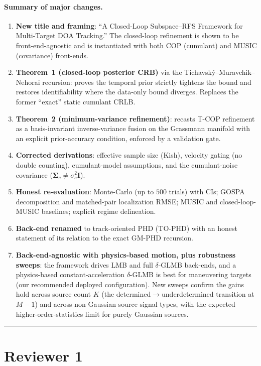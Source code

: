\documentclass[11pt]{article}
\begin{document}
\paragraph{Summary of major changes.}
\begin{enumerate}[leftmargin=*]
\item \textbf{New title and framing}: ``A Closed-Loop Subspace--RFS Framework
  for Multi-Target DOA Tracking.'' The closed-loop refinement is shown to be
  front-end-agnostic and is instantiated with both COP (cumulant) and MUSIC
  (covariance) front-ends.
\item \textbf{Theorem~1 (closed-loop posterior CRB)} via the
  Tichavsk\'y--Muravchik--Nehorai recursion: proves the temporal prior strictly
  tightens the bound and restores identifiability where the data-only bound
  diverges. Replaces the former ``exact'' static cumulant CRLB.
\item \textbf{Theorem~2 (minimum-variance refinement)}: recasts T-COP refinement
  as a basis-invariant inverse-variance fusion on the Grassmann manifold with an
  explicit prior-accuracy condition, enforced by a validation gate.
\item \textbf{Corrected derivations}: effective sample size (Kish), velocity
  gating (no double counting), cumulant-model assumptions, and the cumulant-noise
  covariance ($\mathbf\Sigma_c\neq\sigma_c^2\mathbf I$).
\item \textbf{Honest re-evaluation}: Monte-Carlo (up to $500$ trials) with CIs; GOSPA
  decomposition and matched-pair localization RMSE; MUSIC and closed-loop-MUSIC
  baselines; explicit regime delineation.
\item \textbf{Back-end renamed} to track-oriented PHD (TO-PHD) with an honest
  statement of its relation to the exact GM-PHD recursion.
\item \textbf{Back-end-agnostic with physics-based motion, plus robustness
  sweeps}: the framework drives LMB and full $\delta$-GLMB back-ends, and a
  physics-based constant-acceleration $\delta$-GLMB is best for maneuvering
  targets (our recommended deployed configuration). New sweeps confirm the gains
  hold across source count $K$ (the determined$\to$underdetermined transition at
  $M{-}1$) and across non-Gaussian source signal types, with the expected
  higher-order-statistics limit for purely Gaussian sources.
\end{enumerate}

\hrule
\section*{Reviewer 1}
\end{document}
